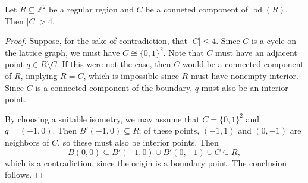 \begin{proposition}\label{prop:big-cycles}
  Let $R \subseteq \mathbb{Z}^2$ be a regular region and $C$ be a conneted component of $\operatorname{bd}(R)$. Then $|C| > 4$.
\end{proposition}
\begin{proof}
  Suppose, for the sake of contradiction, that $|C| \leq 4$. 
  Since $C$ is a cycle on the lattice graph, we must have $C \cong \{0,1\}^2$.
  Note that $C$ must have an adjacent point $q \in R \setminus C$.
  If this were not the case, then $C$ would be a connected component of $R$, implying $R = C$, which is impossible since $R$ must have nonempty interior. 
  Since $C$ is a connected component of the boundary, $q$ must also be an interior point. 
  
  By choosing a suitable isometry, we may assume that $C = \{0, 1\}^2$ and $q = (-1, 0)$. Then $B'(-1, 0) \subseteq R$; of these points, $(-1, 1)$ and $(0, -1)$ are neighbors of $C$, so these must also be interior points. Then
  \begin{equation}
    B(0, 0) \subseteq B'(-1, 0) \cup B'(0, -1) \cup C \subseteq R,
  \end{equation}
  which is a contradiction, since the origin is a boundary point. The conclusion follows.
\end{proof}